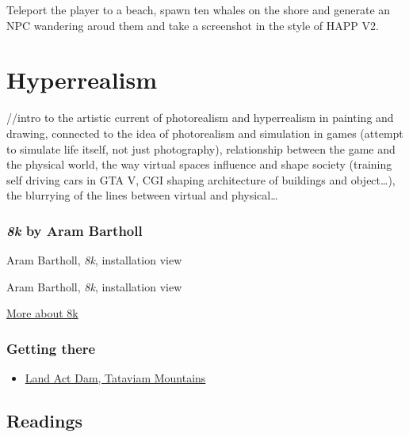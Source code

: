 \documentclass[
  openany]{book}
\providecommand{\tightlist}{%
  \setlength{\itemsep}{0pt}\setlength{\parskip}{0pt}}
\begin{document}
Teleport the player to a beach, spawn ten whales on the shore and generate an NPC wandering aroud them and take a screenshot in the style of HAPP V2.

\hypertarget{hyperrealism}{%
\chapter{Hyperrealism}\label{hyperrealism}}

//intro to the artistic current of photorealism and hyperrealism in painting and drawing, connected to the idea of photorealism and simulation in games (attempt to simulate life itself, not just photography), relationship between the game and the physical world, the way virtual spaces influence and shape society (training self driving cars in GTA V, CGI shaping architecture of buildings and object\ldots), the blurrying of the lines between virtual and physical\ldots{}

\hypertarget{k-by-aram-bartholl}{%
\subsection*{\texorpdfstring{\emph{8k} by Aram Bartholl}{8k by Aram Bartholl}}\label{k-by-aram-bartholl}}

Aram Bartholl, \emph{8k}, installation view

Aram Bartholl, \emph{8k}, installation view

\href{https://arambartholl.com/8k/}{More about 8k}

\hypertarget{getting-there-8}{%
\subsection*{Getting there}\label{getting-there-8}}

\begin{itemize}
\tightlist
\item
  \href{https://grandtheftdata.com/landmarks/\#1672.279,-29.78,4,atlas,name=tataviam_act_dam,Land_Act_Dam,_Tataviam_Mountains}{Land Act Dam, Tataviam Mountains}
\end{itemize}

\hypertarget{readings-5}{%
\section*{Readings}\label{readings-5}}
\end{document}
